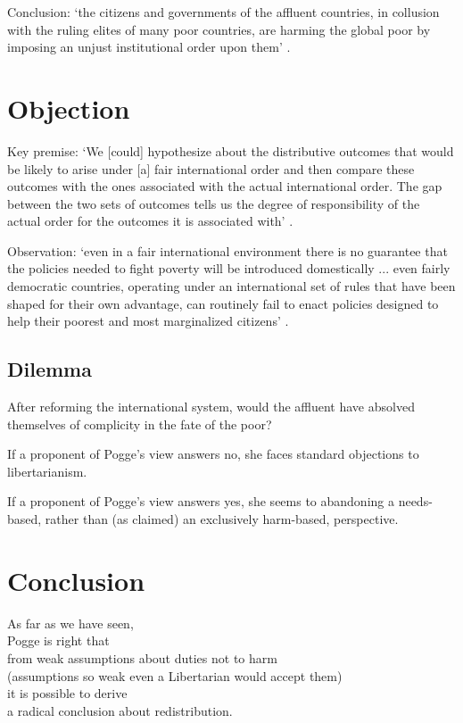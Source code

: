 \documentclass[12pt]{extarticle}
\begin{document}
\begin{multicols*}{3}
Conclusion: ‘the citizens and governments of the affluent countries, in collusion with the ruling elites of many poor countries, are harming the global poor by imposing an unjust institutional order upon them’ \citep[p.~59]{pogge:2005_world}.
	

\section{Objection}

Key premise: ‘We [could] hypothesize about the
distributive outcomes that would be
likely to arise under [a] fair
international order and then compare
these outcomes with the ones associated with the actual international
order. The gap between the two sets of
outcomes tells us the degree of
responsibility of the actual order for
the outcomes it is associated with’
\citep[p.~23]{patten:2005_world}.
 
Observation: ‘even in a fair international environment there is no guarantee that the
policies needed to fight poverty will be introduced domestically ... even fairly democratic countries, operating under an international set of
rules that have been shaped for their own advantage, can routinely fail to
enact policies designed to help their poorest and most marginalized
citizens’
\citep[pp.~23--4]{patten:2005_world}.
 

\subsection{Dilemma}
After reforming the international system, 
would the affluent have absolved themselves of complicity in
the fate of the poor?

If a proponent of Pogge’s view answers no, she faces standard objections to libertarianism.

If a proponent of Pogge’s view answers yes, she seems to abandoning a needs-based, rather than (as claimed) an exclusively harm-based, perspective.


 


\section{Conclusion}    
As far as we have seen, \\
Pogge is right that \\
from weak assumptions about duties not to harm \\
\hspace*{3mm} (assumptions so weak even a Libertarian would accept them) \\
it is possible to derive \\
a radical conclusion about redistribution.


\end{multicols*}
\end{document}

